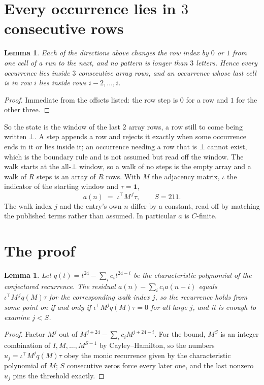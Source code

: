 \documentclass[11pt,a4paper]{article}
\theoremstyle{plain}
\newtheorem{lemma}[theorem]{Lemma}
\theoremstyle{definition}
\begin{document}
\section{Every occurrence lies in $3$ consecutive rows}

\begin{lemma}\label{lem:win}
Each of the directions above changes the row index by $0$ or $1$ from one cell of a run to the
next, and no pattern is longer than $3$ letters. Hence every occurrence lies inside $3$
consecutive array rows, and an occurrence whose last cell is in row $i$ lies inside rows
$i-2,\dots,i$.
\end{lemma}

\begin{proof}
Immediate from the offsets listed: the row step is $0$ for a row and $1$ for the other three.
\end{proof}

So the state is the window of the last $2$ array rows, a row still to come being written
$\bot$. A step appends a row and rejects it exactly when some occurrence ends in it or lies
inside it; an occurrence needing a row that is $\bot$ cannot exist, which is the boundary rule
and is not assumed but read off the window. The walk starts at the all-$\bot$ window, so a walk
of no steps is the empty array and a walk of $R$ steps is an array of $R$ rows. With $M$ the
adjacency matrix, $\iota$ the indicator of the starting window and $\tau=\mathbf{1}$,
\[
a(n)\;=\;\iota^{\!\top}M^{\,j}\tau ,\qquad S=211.
\]
The walk index $j$ and the entry's own $n$ differ by a constant, read off by matching the
published terms rather than assumed. In particular $a$ is $C$-finite.

\section{The proof}

\begin{lemma}\label{lem:crit}
Let $q(t)=t^{24}-\sum_i c_it^{24-i}$ be the characteristic polynomial of the
conjectured recurrence. The residual $a(n)-\sum_ic_ia(n-i)$ equals
$\iota^{\!\top}M^{\,j}q(M)\tau$ for the corresponding walk index $j$, so the recurrence
holds from some point on if and only if $\iota^{\!\top}M^{j}q(M)\tau=0$ for all large $j$,
and it is enough to examine $j<S$.
\end{lemma}

\begin{proof}
Factor $M^{j}$ out of $M^{j+24}-\sum_ic_iM^{j+24-i}$. For the bound, $M^{S}$
is an integer combination of $I,M,\dots,M^{S-1}$ by Cayley--Hamilton, so the numbers
$u_j=\iota^{\!\top}M^{j}q(M)\tau$ obey the monic recurrence given by the characteristic
polynomial of $M$; $S$ consecutive zeros force every later one, and the last nonzero $u_j$
pins the threshold exactly.
\end{proof}
\end{document}
